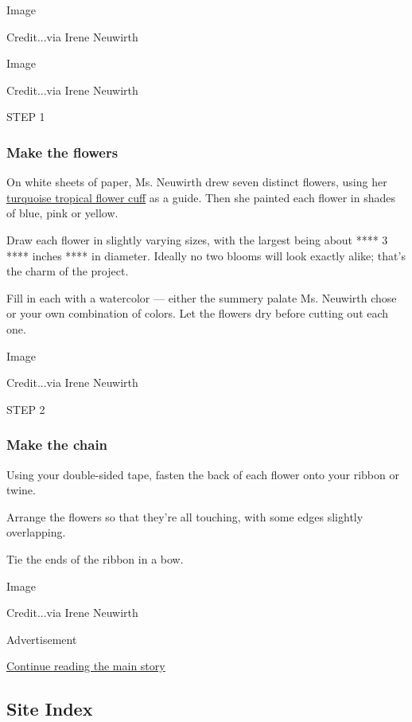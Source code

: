Image

Credit...via Irene Neuwirth

Image

Credit...via Irene Neuwirth

STEP 1

\hypertarget{make-the-flowers}{%
\subsubsection{\texorpdfstring{\textbf{Make the
flowers}}{Make the flowers}}\label{make-the-flowers}}

On white sheets of paper, Ms. Neuwirth drew seven distinct flowers,
using her
\href{https://www.modaoperandi.com/irene-neuwirth-ss20/one-of-a-kind-tropical-flower-cuff}{turquoise
tropical flower cuff} as a guide. Then she painted each flower in shades
of blue, pink or yellow.

Draw each flower in slightly varying sizes, with the largest being about
**** 3 **** inches **** in diameter. Ideally no two blooms will look
exactly alike; that's the charm of the project.

Fill in each with a watercolor --- either the summery palate Ms.
Neuwirth chose or your own combination of colors. Let the flowers dry
before cutting out each one.

Image

Credit...via Irene Neuwirth

STEP 2

\hypertarget{make-the-chain}{%
\subsubsection{\texorpdfstring{\textbf{Make the
chain}}{Make the chain}}\label{make-the-chain}}

Using your double-sided tape, fasten the back of each flower onto your
ribbon or twine.

Arrange the flowers so that they're all touching, with some edges
slightly overlapping.

Tie the ends of the ribbon in a bow.

Image

Credit...via Irene Neuwirth

Advertisement

\protect\hyperlink{after-bottom}{Continue reading the main story}

\hypertarget{site-index}{%
\subsection{Site Index}\label{site-index}}

